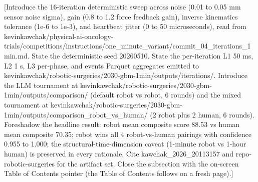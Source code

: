 [Introduce the 16-iteration deterministic sweep across noise (0.01 to
0.05 mm sensor noise sigma), gain (0.8 to 1.2 force feedback gain),
inverse kinematics tolerance (1e-6 to 1e-3), and heartbeat jitter (0
to 50 microseconds), read from
kevinkawchak/physical-ai-oncology-trials/competitions/instructions/one_minute_variant/commit_04_iterations_1min.md.
State the deterministic seed 20260510. State the per-iteration L1
50 ms, L2 1 s, L3 per-phase, and events Parquet aggregates emitted
to kevinkawchak/robotic-surgeries/2030-gbm-1min/outputs/iterations/.
Introduce the LLM tournament at
kevinkawchak/robotic-surgeries/2030-gbm-1min/outputs/comparison/
(default robot vs robot, 6 rounds) and the mixed tournament at
kevinkawchak/robotic-surgeries/2030-gbm-1min/outputs/comparison_robot_vs_human/
(2 robot plus 2 human, 6 rounds). Foreshadow the headline result:
robot mean composite score 88.53 vs human mean composite 70.35; robot
wins all 4 robot-vs-human pairings with confidence 0.955 to 1.000;
the structural-time-dimension caveat (1-minute robot vs 1-hour human)
is preserved in every rationale. Cite kawchak_2026_20113157 and
repo-robotic-surgeries for the artifact set. Close the subsection
with the on-screen Table of Contents pointer (the Table of Contents
follows on a fresh page).]
